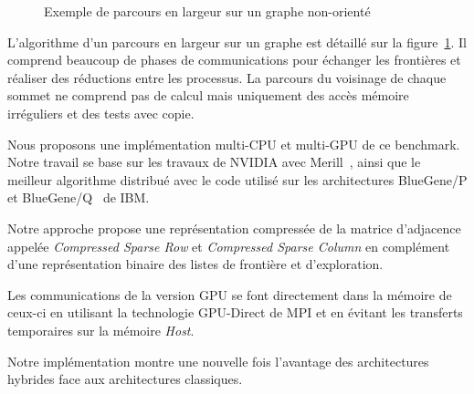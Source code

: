 \documentclass[12pt,a4paper]{report}
\begin{document}
\begin{figure}[ht!]
\centering

\caption{Exemple de parcours en largeur sur un graphe non-orienté}
\label{fig:part2_chap3:BFS}
\end{figure}

L'algorithme d'un parcours en largeur sur un graphe est détaillé sur la figure~\ref{fig:part2_chap3:BFS}.
Il comprend beaucoup de phases de communications pour échanger les frontières et réaliser des réductions entre les processus. 
La parcours du voisinage de chaque sommet ne comprend pas de calcul mais uniquement des accès mémoire irréguliers et des tests avec copie. 

Nous proposons une implémentation multi-CPU et multi-GPU de ce benchmark. 
Notre travail se base sur les travaux de NVIDIA avec Merill~\cite{merrill2015high}, ainsi que le meilleur algorithme distribué avec le code utilisé sur les architectures BlueGene/P et BlueGene/Q~\cite{6468459} de IBM. 

Notre approche propose une représentation compressée de la matrice d'adjacence appelée \textit{Compressed Sparse Row} et \textit{Compressed Sparse Column} en complément d'une représentation binaire des listes de frontière et d'exploration.

Les communications de la version GPU se font directement dans la mémoire de ceux-ci en utilisant la technologie GPU-Direct de MPI et en évitant les transferts temporaires sur la mémoire \textit{Host}. 

Notre implémentation montre une nouvelle fois l'avantage des architectures hybrides face aux architectures classiques.
\end{document}
